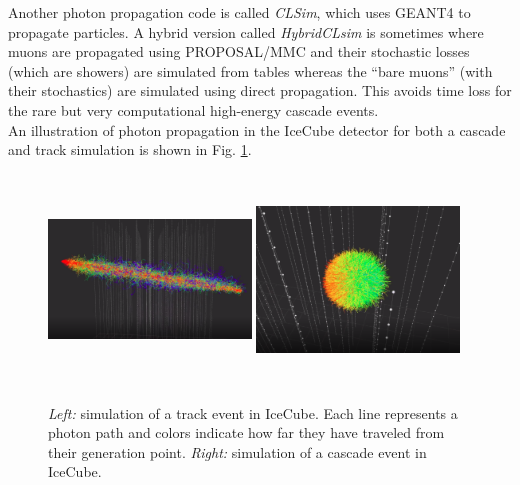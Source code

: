 \noindent Another photon propagation code is called \textit{CLSim}, which uses GEANT4 to propagate particles. A hybrid version called \textit{HybridCLsim} is sometimes where muons are propagated using PROPOSAL/MMC  and their stochastic losses (which are showers) are simulated from tables whereas the ``bare muons'' (with their stochastics) are simulated using direct propagation. This avoids time loss for the rare but very computational high-energy cascade events.\\

\noindent An illustration of photon propagation in the IceCube detector for both a cascade and track simulation is shown in Fig. \ref{fig:photonsimulation}.

\begin{figure}
\centering
\includegraphics[width=0.48\textwidth,height=2.2in]{chapter6/img/photons_track.png}
\includegraphics[width=0.48\textwidth,height=2.2in]{chapter6/img/photons_cascade.png}
\caption{\textit{Left:} simulation of a track event in IceCube. Each line represents a photon path and colors indicate how far they have traveled from their generation point. \textit{Right:} simulation of a cascade event in IceCube.}
\label{fig:photonsimulation}
\end{figure}


